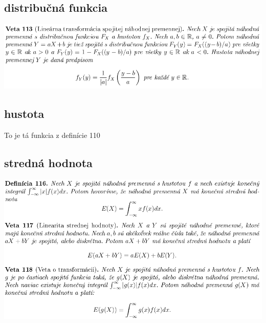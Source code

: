 \subsection {distribučná funkcia}
\includegraphics[width=1\textwidth]{images/dist_funk_spoj}\\
\subsection {hustota}
To je tá funkcia z definície 110\\
\subsection {stredná hodnota}
\includegraphics[width=1\textwidth]{images/stred_hod_spoj}\\
